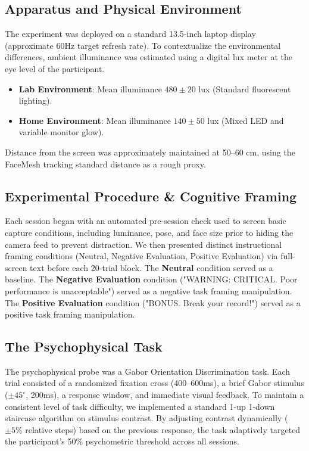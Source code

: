 \documentclass[final,3p,times,twocolumn]{elsarticle}
\begin{document}
\subsection{Apparatus and Physical Environment}
The experiment was deployed on a standard 13.5-inch laptop display (approximate 60Hz target refresh rate).
To contextualize the environmental differences, ambient illuminance was estimated using a digital lux meter at the eye level of the participant.
\begin{itemize}
    \item \textbf{Lab Environment}: Mean illuminance $480 \pm 20$ lux (Standard fluorescent lighting).
    \item \textbf{Home Environment}: Mean illuminance $140 \pm 50$ lux (Mixed LED and variable monitor glow).
\end{itemize}
Distance from the screen was approximately maintained at 50--60 cm, using the FaceMesh tracking standard distance as a rough proxy.

\subsection{Experimental Procedure \& Cognitive Framing}
Each session began with an automated pre-session check used to screen basic capture conditions, including luminance, pose, and face size prior to hiding the camera feed to prevent distraction. 
We then presented distinct instructional framing conditions (Neutral, Negative Evaluation, Positive Evaluation) via full-screen text before each 20-trial block. 
The \textbf{Neutral} condition served as a baseline. The \textbf{Negative Evaluation} condition ("WARNING: CRITICAL. Poor performance is unacceptable") served as a negative task framing manipulation. The \textbf{Positive Evaluation} condition ("BONUS. Break your record!") served as a positive task framing manipulation.

\subsection{The Psychophysical Task}
The psychophysical probe was a Gabor Orientation Discrimination task. Each trial consisted of a randomized fixation cross (400--600ms), a brief Gabor stimulus ($\pm 45^\circ$, 200ms), a response window, and immediate visual feedback. 
To maintain a consistent level of task difficulty, we implemented a standard 1-up 1-down staircase algorithm on stimulus contrast. By adjusting contrast dynamically ($\pm 5\%$ relative steps) based on the previous response, the task adaptively targeted the participant's 50\% psychometric threshold across all sessions.
\end{document}
